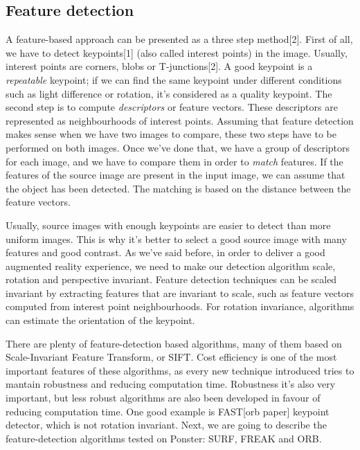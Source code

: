 \subsection{Feature detection}

A feature-based approach can be presented as a three step method[2]. First of all, we
have to detect keypoints[1] (also called interest points) in the image. Usually,
interest points are corners, blobs or T-junctions[2]. A good keypoint is a
\emph{repeatable} keypoint; if we can find the same keypoint under different
conditions such as light difference or rotation, it's considered as a quality
keypoint. The second step is to compute \emph{descriptors} or feature
vectors. These descriptors are represented as neighbourhoods of interest
points. Assuming that feature
detection makes sense when we have two images to compare, these two steps have to be
performed on both images. Once we've done that, we have a group of descriptors for
each image, and we have to compare them in order to \emph{match} features. If the
features of the source image are present in the input image, we can assume that the
object has been detected. The matching is based on the distance between the feature
vectors. 

Usually, source images with enough keypoints are easier to detect than more
uniform images. This is why it's better to select a good source image with many
features and good contrast. 
As we've said before, in order to deliver a good augmented reality experience,
we need to make our detection algorithm scale, rotation and perspective
invariant. Feature detection techniques can be scaled invariant by extracting
features that are invariant to scale, such as feature vectors computed from
interest point neighbourhoods. For rotation invariance, algorithms can
estimate the orientation of the keypoint. %

There are plenty of feature-detection based algorithms, many of them based on
Scale-Invariant Feature Transform, or SIFT. Cost efficiency is one of the most
important features of these algorithms, as every new technique introduced tries to
mantain robustness and reducing computation time. Robustness it's also very
important, but less robust algorithms are also been developed in favour of reducing
computation time. One good example is FAST[orb paper] keypoint detector, which is
not rotation invariant. %
Next, we are going to describe the feature-detection algorithms tested on Ponster:
SURF, FREAK and ORB.

